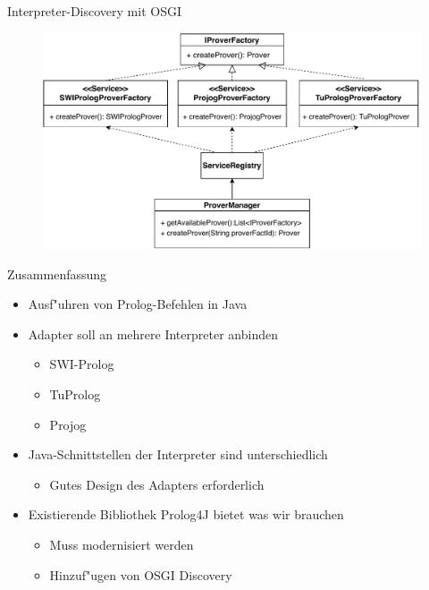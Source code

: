 \documentclass[18pt]{beamer}
\begin{document}
\begin{frame}{Interpreter-Discovery mit OSGI}
\begin{figure}[h]
\centering
\includegraphics[width=1\textwidth]{osgi.pdf}
\end{figure}
\end{frame}


\begin{frame}{Zusammenfassung}
\begin{itemize}
\item Ausf"uhren von Prolog-Befehlen in Java
\item Adapter soll an mehrere Interpreter anbinden
\begin{itemize}
\item SWI-Prolog
\item TuProlog
\item Projog
\end{itemize}
\item Java-Schnittstellen der Interpreter sind unterschiedlich
\begin{itemize}
\item Gutes Design des Adapters erforderlich
\end{itemize}
\item Existierende Bibliothek Prolog4J bietet was wir brauchen
\begin{itemize}
\item Muss modernisiert werden
\item Hinzuf"ugen von OSGI Discovery
\end{itemize}
\end{itemize}
\end{frame}
\end{document}
